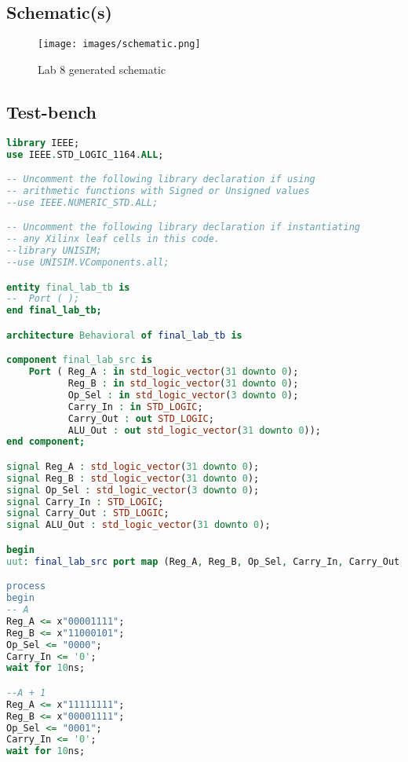 \documentclass[notitlepage,a4paper,oneside,article,table]{article}
\begin{document}
\subsection{Schematic(s)}

\begin{figure}[h] %
    \centering
    \texttt{[image: images/schematic.png]}
    \caption{Lab 8 generated schematic}
\end{figure}
\FloatBarrier


\subsection{Test-bench}

\lstset{style=mystyle}
\begin{lstlisting}[language=VHDL, caption=IC test-bench scr code]
library IEEE;
use IEEE.STD_LOGIC_1164.ALL;

-- Uncomment the following library declaration if using
-- arithmetic functions with Signed or Unsigned values
--use IEEE.NUMERIC_STD.ALL;

-- Uncomment the following library declaration if instantiating
-- any Xilinx leaf cells in this code.
--library UNISIM;
--use UNISIM.VComponents.all;

entity final_lab_tb is
--  Port ( );
end final_lab_tb;

architecture Behavioral of final_lab_tb is

component final_lab_src is
    Port ( Reg_A : in std_logic_vector(31 downto 0);
           Reg_B : in std_logic_vector(31 downto 0);
           Op_Sel : in std_logic_vector(3 downto 0);
           Carry_In : in STD_LOGIC;
           Carry_Out : out STD_LOGIC;
           ALU_Out : out std_logic_vector(31 downto 0));
end component;

signal Reg_A : std_logic_vector(31 downto 0);
signal Reg_B : std_logic_vector(31 downto 0);
signal Op_Sel : std_logic_vector(3 downto 0);
signal Carry_In : STD_LOGIC;
signal Carry_Out : STD_LOGIC;
signal ALU_Out : std_logic_vector(31 downto 0);

begin
uut: final_lab_src port map (Reg_A, Reg_B, Op_Sel, Carry_In, Carry_Out, ALU_Out);

process
begin
-- A 
Reg_A <= x"00001111";
Reg_B <= x"11000101";
Op_Sel <= "0000";
Carry_In <= '0';
wait for 10ns;

--A + 1
Reg_A <= x"11111111";
Reg_B <= x"00001111";
Op_Sel <= "0001";
Carry_In <= '0';
wait for 10ns;


\end{lstlisting}
\end{document}
